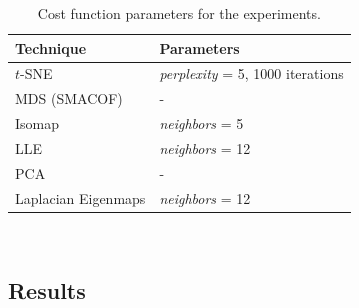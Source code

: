 \begin{table}[H]
	\centering
	\begin{tabular}{| l | l |}
		\hline
		Technique & Parameters \\
		\hline			
		$t$-SNE & \textit{perplexity} = 5, 1000 iterations    \\
		MDS (SMACOF) & -  \\
		Isomap & \textit{neighbors} = 5  \\
		LLE & \textit{neighbors} = 12 \\
		PCA & - \\
		Laplacian Eigenmaps & \textit{neighbors} = 12 \\
		\hline  
	\end{tabular}\\
	\caption{Cost function parameters for the experiments.}
\end{table}

\subsection{Results}




